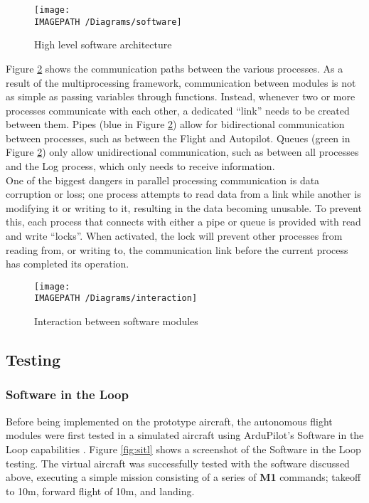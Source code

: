 \begin{figure}[!ht]
	\centering
	\texttt{[image: \\IMAGEPATH /Diagrams/software]}
	\caption{High level software architecture}
	\label{fig:softwarearchitecture}
\end{figure}

Figure \ref{fig:softwareinteraction} shows the communication paths between the various processes. As a result of the multiprocessing framework, communication between modules is not as simple as passing variables through functions. Instead, whenever two or more processes communicate with each other, a dedicated ``link'' needs to be created between them. Pipes (blue in Figure \ref{fig:softwareinteraction}) allow for bidirectional communication between processes, such as between the Flight and Autopilot. Queues (green in Figure \ref{fig:softwareinteraction}) only allow unidirectional communication, such as between all processes and the Log process, which only needs to receive information.\\

One of the biggest dangers in parallel processing communication is data corruption or loss; one process attempts to read data from a link while another is modifying it or writing to it, resulting in the data becoming unusable. To prevent this, each process that connects with either a pipe or queue is provided with read and write ``locks''. When activated, the lock will prevent other processes from reading from, or writing to, the communication link before the current process has completed its operation.

\begin{figure}[H]
	\centering
	\texttt{[image: \\IMAGEPATH /Diagrams/interaction]}
	\caption{Interaction between software modules}
	\label{fig:softwareinteraction}
\end{figure}

\subsection{Testing}
\subsubsection*{Software in the Loop}
Before being implemented on the prototype aircraft, the autonomous flight modules were first tested in a simulated aircraft using ArduPilot's Software in the Loop capabilities \cite{ref:sitl}. Figure \ref{fig:sitl} shows a screenshot of the Software in the Loop testing. The virtual aircraft was successfully tested with the software discussed above, executing a simple mission consisting of a series of \textbf{M1} commands; takeoff to 10m, forward flight of 10m, and landing.

